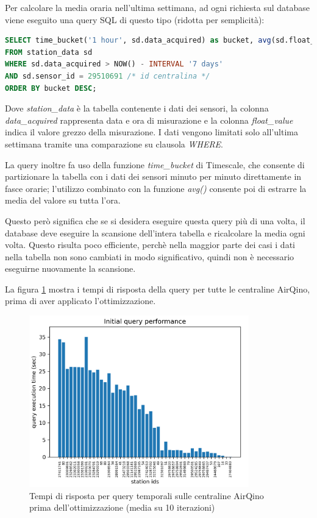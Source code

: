 Per calcolare la media oraria nell'ultima settimana, ad ogni richiesta sul database viene eseguito una query SQL di questo tipo (ridotta per semplicità):

\vspace{1mm}
\begin{lstlisting}[language=sql]
SELECT time_bucket('1 hour', sd.data_acquired) as bucket, avg(sd.float_value)
FROM station_data sd
WHERE sd.data_acquired > NOW() - INTERVAL '7 days'
AND sd.sensor_id = 29510691 /* id centralina */
ORDER BY bucket DESC;
\end{lstlisting}

Dove \textit{station\_data} è la tabella contenente i dati dei sensori, la colonna \textit{data\_acquired} rappresenta data e ora di misurazione e la colonna \textit{float\_value} indica il valore grezzo della misurazione.
I dati vengono limitati solo all'ultima settimana tramite una comparazione su clausola \textit{WHERE}.

La query inoltre fa uso della funzione \textit{time\_bucket} di Timescale, che consente di partizionare la tabella con i dati dei sensori minuto per minuto direttamente in fasce orarie; l'utilizzo combinato con la funzione \textit{avg()} consente poi di estrarre la media del valore su tutta l'ora.

Questo però significa che se si desidera eseguire questa query più di una volta, il database deve eseguire la scansione dell'intera tabella e ricalcolare la media ogni volta. Questo risulta poco efficiente, perchè nella maggior parte dei casi i dati nella tabella non sono cambiati in modo significativo, quindi non è necessario eseguirne nuovamente la scansione.

La figura \ref{fig:query-prima} mostra i tempi di risposta della query per tutte le centraline AirQino, prima di aver applicato l'ottimizzazione.

\begin{figure}[H]
\centering
\captionsetup{justification=centering}
\includegraphics[width=0.85\textwidth,height=\textheight,keepaspectratio]{img/query_prima}
\caption{Tempi di risposta per query temporali sulle centraline AirQino prima dell'ottimizzazione (media su 10 iterazioni)}
\label{fig:query-prima}
\end{figure}


